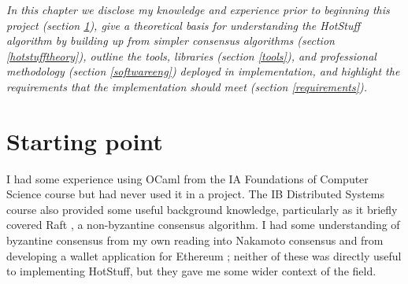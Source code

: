 




\textit{In this chapter we disclose my knowledge and experience prior to beginning this project (section \ref{start}), give a theoretical basis for understanding the HotStuff algorithm by building up from simpler consensus algorithms (section \ref{hotstufftheory}), outline the tools, libraries (section \ref{tools}), and professional methodology (section \ref{softwareeng}) deployed in implementation, and highlight the requirements that the implementation should meet (section \ref{requirements}).}

\section{Starting point} \label{start}
I had some experience using OCaml from the IA Foundations of Computer Science course but had never used it in a project. The IB Distributed Systems course also provided some useful background knowledge, particularly as it briefly covered Raft \cite{ongaro_search_nodate}, a non-byzantine consensus algorithm. I had some understanding of byzantine consensus from my own reading into Nakamoto consensus \cite{nakamoto_bitcoin_nodate} and from developing a wallet application for Ethereum \cite{wood_ethereum_nodate}; neither of these was directly useful to implementing HotStuff, but they gave me some wider context of the field.

